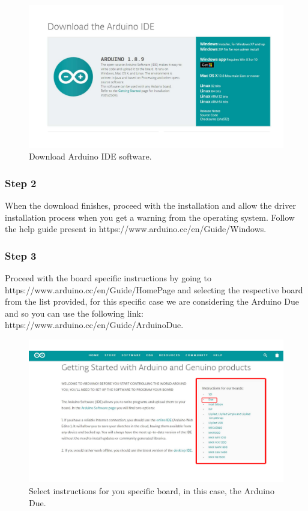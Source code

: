 \begin{refsection}
\begin{figure}[H]
	\centering
	\includegraphics[width=0.86\linewidth]{./sdf/arduino_quantum_rx/figures/arduinoDownload.pdf}
	\caption{Download Arduino IDE software.}
	\label{arduinoDownload}
\end{figure}


\subsubsection{Step 2}

When the download finishes, proceed with the installation and allow the driver installation process when you get a warning from the operating system. Follow the help guide present in https://www.arduino.cc/en/Guide/Windows.

\subsubsection{Step 3}

Proceed with the board specific instructions by going to https://www.arduino.cc/en/Guide/HomePage and selecting the respective board from the list provided, for this specific case we are considering the Arduino Due and so you can use the following link: https://www.arduino.cc/en/Guide/ArduinoDue.

\begin{figure}[H]
	\centering
	\includegraphics[width=1\linewidth]{./sdf/arduino_quantum_rx/figures/arduinoBoards.pdf}
	\caption{Select instructions for you specific board, in this case, the Arduino Due.}
	\label{arduinoDownload}
\end{figure}


\end{refsection}
